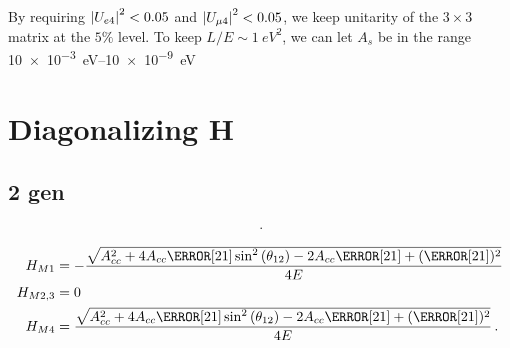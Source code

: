 \documentclass[twocolumn]{article}
\begin{document}
By requiring $\abs{U_{e4}}^2 < 0.05$ and $\abs{U_{\mu 4}}^2 < 0.05$, we keep unitarity of the $3 \times 3$ matrix at the $5\%$ level. To keep $L/E \sim \SI{1}{eV^2}$, we can let $A_s$ be in the range \SIrange{10e-3}{10e-9}{eV}

\section*{Diagonalizing H}
\subsection*{2 gen}
\begin{align*} 

\,.\end{align*}


\begin{align*}
  H_{M1} &= - \frac{\sqrt{A_{cc}^{2} + 4 A_{cc} \dm[21] \sin^{2}{\left(\theta_{12} \right)} - 2 A_{cc} \dm[21] + (\dm[21])^{2}}}{4 E} \\
  H_{M2,3} &=0 \\
  H_{M4} &= \frac{\sqrt{A_{cc}^{2} + 4 A_{cc} \dm[21] \sin^{2}{\left(\theta_{12} \right)} - 2 A_{cc} \dm[21] + (\dm[21])^{2}}}{4 E}
\,.\end{align*}


 
\end{document}

